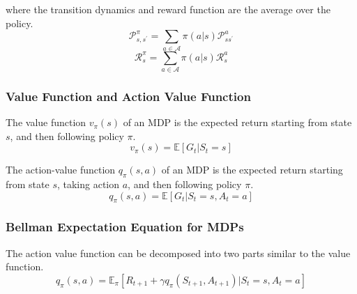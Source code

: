where the transition dynamics and reward function are the average over the policy.
\[
    \mathcal{P}_{s,s^{\prime}}^{\pi} = \sum_{a \in \mathcal{A} } \pi (a|s) \mathcal{P}_{ss^{\prime}}^{a}  
\]
\[
    \mathcal{R}_{s}^{\pi} = \sum_{a \in \mathcal{A} } \pi (a|s) \mathcal{R}_{s}^{a}
\]

\subsubsection{Value Function and Action Value Function}
\begin{definition}
    The value function \(v_{\pi} (s)\) of an MDP is the expected return starting from state \(s\),
    and then following policy \(\pi \).
    \[
        v_{\pi} (s) = \mathbb{E}  [ G_{t} | S_{t} = s]  
    \]
\end{definition}
\begin{definition}
    The action-value function \(q_{\pi} (s, a)\) of an MDP is the expected return starting from state \(s\),
    taking action \(a\), and then following policy \(\pi \).
    \[
        q_{\pi} (s, a) = \mathbb{E}  [ G_{t} | S_{t} = s, A_{t} = a]  
    \] 
\end{definition}

\subsubsection{Bellman Expectation Equation for MDPs}
The action value function can be decomposed into two parts similar to the value function.
\[
        q_{\pi} (s, a) = \mathbb{E} _\pi \left[    R_{t+1} + \gamma q_\pi (S_{t+1} , A_{t+1} ) | 
        S_t = s, A_t = a \right]
\]

